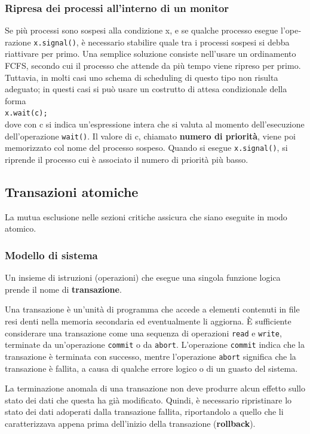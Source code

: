 \documentclass[11pt,a4paper]{article}
\begin{document}
\subsubsection{Ripresa dei processi all'interno di un monitor}
Se più processi sono sospesi alla condizione x, e se qualche processo esegue l'ope­razione \texttt{x.signal()}, è necessario stabilire quale tra i processi sospesi si debba riattivare per
primo. Una semplice soluzione consiste nell'usare un ordinamento FCFS, secondo cui il pro­cesso che attende da più tempo viene ripreso per primo. Tuttavia, in molti casi uno schema
di scheduling di questo tipo non risulta adeguato; in questi casi si può usare un costrutto di
attesa condizionale della forma\\ \texttt{x.wait(c);}\\
dove con c si indica un'espressione intera che si valuta al momento dell'esecuzione dell'ope­razione \texttt{wait()}. Il valore di c, chiamato \textbf{numero di priorità}, viene poi memorizzato col no­me del processo sospeso. Quando si esegue \texttt{x.signal()}, si riprende il processo cui è asso­ciato il numero di priorità più basso.

\subsection{Transazioni atomiche}
La mutua esclusione nelle sezioni critiche assicura che siano eseguite in modo atomico.

\subsubsection{Modello di sistema}
Un insieme di istruzioni (operazioni) che esegue una singola funzione logica prende il nome
di \textbf{transazione}.

Una transazione è un'unità di programma che accede a elementi contenuti in file resi­
denti nella memoria secondaria ed eventualmente li aggiorna. È sufficiente considerare una transazione come una sequenza di operazioni \texttt{read}
e \texttt{write}, terminate da un'operazione \texttt{commit} o da \texttt{abort}. L'operazione \texttt{commit} indica
che la transazione è terminata con successo, mentre l'operazione \texttt{abort} significa che la
transazione è fallita, a causa di qualche errore logico o di un guasto del sistema.

La terminazione anomala di una transazione non deve produrre alcun effetto sullo
stato dei dati che questa ha già modificato.
Quindi, è necessario ripristinare lo stato dei dati adoperati dalla transazione fallita, ri­portandolo a quello che li caratterizzava appena prima dell'inizio della transazione (\textbf{rollback}).
\end{document}
